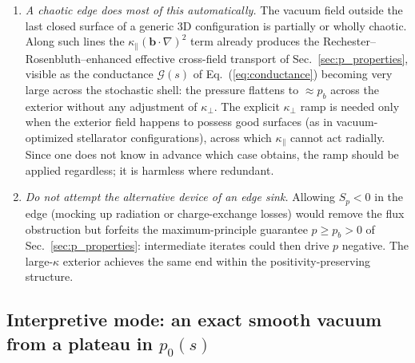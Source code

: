 \documentclass[english]{article}
\newcommand{\bb}{\mathbf{b}}
\begin{document}
\begin{enumerate}
\item \emph{A chaotic edge does most of this automatically.} The vacuum field outside the last
closed surface of a generic 3D configuration is partially or wholly chaotic. Along such lines the
$\kappa_\parallel(\bb\cdot\nabla)^{2}$ term already produces the Rechester--Rosenbluth--enhanced
effective cross-field transport of Sec.~\ref{sec:p_properties}, visible as the conductance $\mathcal G(s)$
of Eq.~(\ref{eq:conductance}) becoming very large across the stochastic shell: the pressure
flattens to $\approx p_b$ across the exterior without any adjustment of $\kappa_\perp$. The
explicit $\kappa_\perp$ ramp is needed only when the exterior field happens to possess good
surfaces (as in vacuum-optimized stellarator configurations), across which $\kappa_\parallel$
cannot act radially. Since one does not know in advance which case obtains, the ramp should be
applied regardless; it is harmless where redundant.
\item \emph{Do not attempt the alternative device of an edge sink.} Allowing $S_p<0$ in the edge
(mocking up radiation or charge-exchange losses) would remove the flux obstruction but forfeits
the maximum-principle guarantee $p\ge p_b>0$ of Sec.~\ref{sec:p_properties}: intermediate iterates
could then drive $p$ negative. The large-$\kappa$ exterior achieves the same end within the
positivity-preserving structure.
\end{enumerate}

\subsection{Interpretive mode: an exact smooth vacuum from a plateau in $p_0(s)$}
\label{sec:edge_interpretive}
\end{document}
